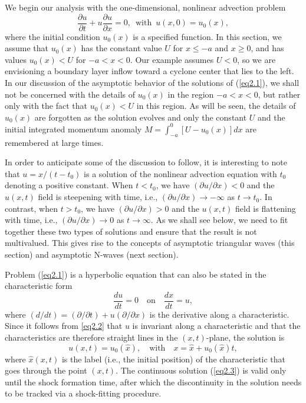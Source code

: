 \documentclass[10pt]{article}
\begin{document}
     We begin our analysis with the one-dimensional, nonlinear advection problem
\begin{equation}                                 %
     \frac{\partial u}{\partial t} + u\frac{\partial u}{\partial x} = 0,
     \,\,\,\text{with}\,\,\,   u(x,0) = u_0(x),
\label{eq2.1}
\end{equation}
where the initial condition $u_0(x)$ is a specified function.
In this section, we assume that $u_0(x)$ has the constant value $U$
for $x\leq -a$ and $x\geq0$, and has values $u_0(x)<U$ for $-a<x<0$. Our
example assumes $U<0$, so we are envisioning a boundary layer inflow
toward a cyclone center that lies to the left.
In our discussion of the asymptotic behavior of the solutions of
(\ref{eq2.1}), we shall not be concerned with the details of $u_0(x)$
in the region $-a<x<0$, but rather only with the fact that $u_0(x)<U$
in this region.  As will be seen, the details of $u_0(x)$ are
forgotten as the solution evolves and only the constant $U$ and
the initial integrated momentum anomaly $M=\int_{-a}^0 [U-u_0(x)]dx$
are remembered at large times.

    In order to anticipate some of the discussion to follow, it is interesting
to note that $u=x/(t-t_0)$ is a solution of the nonlinear advection equation with
$t_0$ denoting a positive constant. When $t<t_0$, we have $(\partial u/\partial x)<0$
and the $u(x,t)$ field is steepening with time, i.e.,
$(\partial u/\partial x) \to -\infty$ as $t \to t_0$. In contrast, when
$t>t_0$, we have $(\partial u/\partial x)>0$ and the $u(x,t)$ field is flattening
with time, i.e., $(\partial u/\partial x) \to 0$ as $t \to \infty$.
As we shall see below, we need to fit together these two types of solutions
and ensure that the result is not multivalued. This gives rise to the concepts
of asymptotic triangular waves (this section) and asymptotic N-waves (next section).

     Problem (\ref{eq2.1}) is a hyperbolic equation that can also
be stated in the characteristic form
\begin{equation}                                 %
     \frac{du}{dt} = 0  \quad \text{on} \quad \frac{dx}{dt} = u,
\label{eq2.2}
\end{equation}
where $(d/dt)=(\partial/\partial t)+u(\partial/\partial x)$ is the
derivative along a characteristic. Since it follows from \eqref{eq2.2}
that $u$ is invariant along a characteristic and that the characteristics
are therefore straight lines in the $(x,t)$-plane, the solution is
\begin{equation}                                 %
     u(x,t) = u_0(\hat{x}),  \quad\text{with}\quad
          x = \hat{x} + u_0(\hat{x}) t,
\label{eq2.3}
\end{equation}
where $\hat{x}(x,t)$ is the label (i.e., the initial position) of the
characteristic that goes through the point $(x,t)$. The continuous
solution (\ref{eq2.3}) is valid only until the shock formation time,
after which the discontinuity in the solution needs to be tracked via a
shock-fitting procedure.
\end{document}

